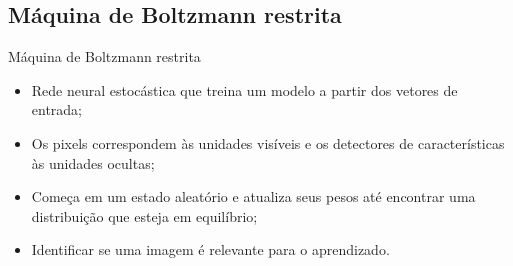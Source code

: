 \documentclass{beamer}
\begin{document}
\subsection{Máquina de Boltzmann restrita}
\begin{frame}{Máquina de Boltzmann restrita}
\begin{itemize}
  \item Rede neural estocástica que treina um modelo a partir dos vetores de entrada;
  \item Os pixels correspondem às unidades visíveis e os detectores de características às unidades ocultas;
  \item Começa em um estado aleatório e atualiza seus pesos até encontrar uma distribuição que esteja em equilíbrio;
  \item Identificar se uma imagem é relevante para o aprendizado.
\end{itemize}

\end{frame}
\end{document}

